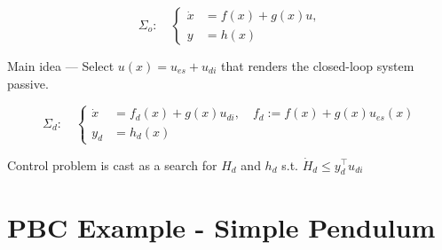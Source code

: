 \documentclass[
]{report}
\begin{document}
\[
\Sigma_o: \quad
\begin{cases}
  \dot{x} &= f(x) + g(x)u, \\
  y &= h(x)
\end{cases}
\]

Main idea --- Select \(u(x) = u_{es} + u_{di}\) that renders the
closed-loop system passive.

\[
\Sigma_d: \quad
\begin{cases}
  \dot{x} &= f_d(x) + g(x) u_{di}, \quad f_d := f(x) + g(x) u_{es}(x) \\
  y_d &= h_d(x)
\end{cases}
\]

Control problem is cast as a search for \(H_d\) and \(h_d\) s.t.
\(\dot{H}_d \leq y_d^\top u_{di}\)

\hypertarget{pbc-example---simple-pendulum}{%
\section{PBC Example - Simple
Pendulum}\label{pbc-example---simple-pendulum}}
\end{document}
